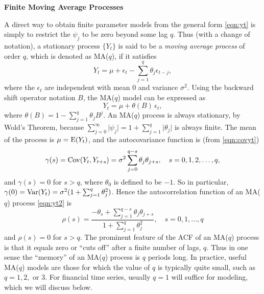 \noindent \textbf{Finite Moving Average Processes} \twomedskip


A direct way to obtain finite parameter models from the general form \eqref{eqn:yt} is simply to restrict the $\psi_j$ to be zero beyond some lag $q$. Thus (with a change of notation), a stationary process $\{ Y_t \}$ is said to be a \emph{moving average process} of order $q$, which is denoted as MA($q$), if it satisfies
	\begin{equation} \label{eqn:yt2}
	Y_t = \mu + \epsilon_t - \sum_{j=1}^{q} \theta_j \epsilon_{t-j},
	\end{equation}
where the $\epsilon_t$ are independent with mean 0 and variance $\sigma^2$. Using the backward shift operator notation $B$, the MA($q$) model can be expressed as
	\begin{equation*}
         Y_t= \mu + \theta(B) \, \epsilon_t,	
	\end{equation*}
where $\theta(B) = 1 - \sum_{j=1}^q \theta_j B^j$.  An MA($q$)  process is always stationary, by Wold's Theorem, because $\sum_{j=0}^{\infty} \lvert \psi_j \rvert= 1 + \sum_{j=1}^q \lvert \theta_j \rvert$ is always finite. The mean of the process is $\mu = \operatorname{E}(Y_t)$, and the autocovariance function is (from \eqref{eqn:covyt})
	\begin{equation*}
            \gamma(s)= \operatorname{Cov} (Y_t, Y_{t+s})= \sigma^2 \sum_{j=0}^{q-s} \theta_j \theta_{j+s}, \quad s = 0, 1, 2, \ldots, q,	
	\end{equation*}
and $\gamma(s)= 0$ for $s > q$, where $\theta_0$ is defined to be $-1$. So in particular, $\gamma(0)=  \operatorname{Var}(Y_t) = \sigma^2 (1 + \sum_{j=1}^q \theta_j^2)$. Hence the autocorrelation function of an MA($q$) process \eqref{eqn:yt2} is
       \begin{equation} \label{eqn:rhos}
	\rho(s) = \dfrac{-\theta_s + \sum_{j=1}^{q-s} \theta_j \theta_{j+s}}{1 + \sum_{j=1}^q \theta_j^2}, \quad s = 0,1,\ldots, q
       \end{equation}
and $\rho(s)= 0$ for $s > q$. The prominent feature of the ACF of an MA($q$) process is that it equals zero or ``cuts off'' after a finite number of lags, $q$. Thus in one sense the ``memory'' of an MA($q$) process is $q$ periods long. In practice, useful MA($q$) models are those for which the value of $q$ is typically quite small, such as $q= 1, 2,$ or $3$.  For financial time series, usually $q= 1$ will suffice for modeling, which we will discuss below. 


